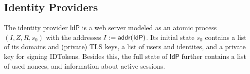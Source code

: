 \documentclass[letterpaper,onecolumn,10pt]{article}
\begin{document}
\begin{algorithmic}[1]
      \mystop{}
    \ENDIF
    \ENDIF
    \ENDIF
    \ENDIF
    \label{line:gen-acct}
    \label{line:add-service-token}
  \ENDIF
  \mystop{}
\end{algorithmic}\setlength{\parindent}{1em}

\subsection{Identity Providers} \label{app:idps}

The identity provider $\mathsf{IdP}$ is a web server 
modeled as an atomic process $(I, Z, R, s_0)$ with 
the addresses $I := \mathsf{addr}(\mathsf{IdP})$. 
Its initial state $s_0$ contains a list of its 
domains and (private) TLS keys, 
a list of users and identites, and a private key 
for signing IDTokens. Besides this, 
the full state of $\mathsf{IdP}$ further contains a list 
of used nonces, and information about active sessions.
\end{document}
